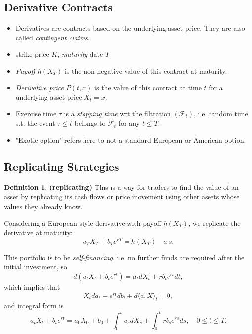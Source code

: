 \documentclass[a4paper,12pt]{article}
\numberwithin{equation}{section}
\theoremstyle{definition}
\newtheorem{definition}{Definition}[section]
\theoremstyle{remark}
\begin{document}
\subsection*{Derivative Contracts}
\label{sec:derivative_contract}
\begin{itemize}
    \item Derivatives are contracts based on the underlying 
    asset price. They are also called \textit{contingent claims}.
    \item strike price $K$, \textit{maturity} date $T$
    \item \textit{Payoff} $h(X_T)$
    is the non-negative value of this contract at maturity.
    \item \textit{Derivative price} $P(t,x)$ is the value of 
    this contract at time $t$ for a underlying asset price 
    $X_t = x$.
    \item Exercise time $\tau$ is a \textit{stopping time}
    wrt the filtration $(\mathcal{F}_t)$, 
    i.e. random time s.t. the event ${\tau\leq t}$ belongs 
    to $\mathcal{F}_t$ for any $t\leq T$.
    \item "Exotic option" refers here to not a standard European 
    or American option.
\end{itemize}

\subsection{Replicating Strategies}
\begin{definition}
\textbf{(replicating)} This is a way for traders to 
find the value of an asset by replicating its cash flows or price 
movement using other assets whose values they already know.
\end{definition}

Considering a European-style derivative with payoff $h(X_{T})$, 
we replicate the derivative at maturity:
\begin{equation}
\label{eq:replicating_bs}
    a_T X_T + b_T e^{rT} = h(X_T)\quad a.s.
\end{equation}

This portfolio is to be \textit{self-financing}, i.e. 
no further funds are required after the initial investment, 
so 
\begin{equation}
\label{eq:self_financing_definition}
    d(a_{t}X_{t}+b_{t}e^{rt})=a_{t}dX_{t}+rb_{t}e^{rt}dt,
\end{equation}
which implies that 
\begin{equation}
    X_{t}da_{t}+e^{rt}db_{t}+d\langle a,X\rangle_t = 0,
\end{equation}
and integral form is 
\begin{equation}
    a_{t}X_{t}+b_{t}e^{rt}=a_{0}X_{0}+b_{0}+
    \int_{0}^{t} a_s dX_{s}+\int_{0}^{t} rb_{s}e^{rs} ds,
    \quad 0\leq t\leq T.
\end{equation}
\end{document}
